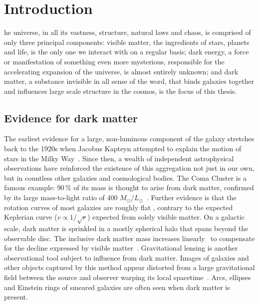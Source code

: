 %
%
\chapter{Introduction}
\label{chap:intro}


he universe, in all its vastness, structure, natural laws and chaos, is comprised of only three principal components: visible matter, the ingredients of stars, planets and life, is the only one we interact with on a regular basis; dark energy, a force or manifestation of something even more mysterious, responsible for the accelerating expansion of the universe, is almost entirely unknown; and dark matter, a substance invisible in all sense of the word, that binds galaxies together and influences large scale structure in the cosmos, is the focus of this thesis.




\section{Evidence for dark matter}
\label{sec:intro_dm_evidence}

The earliest evidence for a large, non-luminous component of the galaxy stretches back to the 1920s when Jacobus Kapteyn attempted to explain the motion of stars in the Milky Way~\cite{1922ApJ....55..302K}. Since then, a wealth of independent astrophysical observations have reinforced the existence of this aggregation not just in our own, but in countless other galaxies and cosmological bodies. The Coma Cluster is a famous example: 90\,\% of its mass is thought to arise from dark matter, confirmed by its large mass-to-light ratio of 400 $M_{\odot} / L_{\odot}$~\cite{Yozin:2015mla}. Further evidence is that the rotation curves of most galaxies are roughly flat \cite{1996MNRAS-281-27P}, contrary to the expected Keplerian curve ($v \propto 1/\sqrt{r}$) expected from solely visible matter. On a galactic scale, dark matter is sprinkled in a mostly spherical halo that spans beyond the observable disc. The inclusive dark matter mass increases linearly~\cite{2009arXiv0901.0632E} to compensate for the decline expressed by visible matter~\cite{1970ApJ-160-811F,1992AandA-256-19B}. Gravitational lensing is another observational tool subject to influence from dark matter. Images of galaxies and other objects captured by this method appear distorted from a large gravitational field between the source and observer warping its local spacetime~\cite{2010GReGr..42.2177H}. Arcs, ellipses and Einstein rings of smeared galaxies are often seen when dark matter is present.

